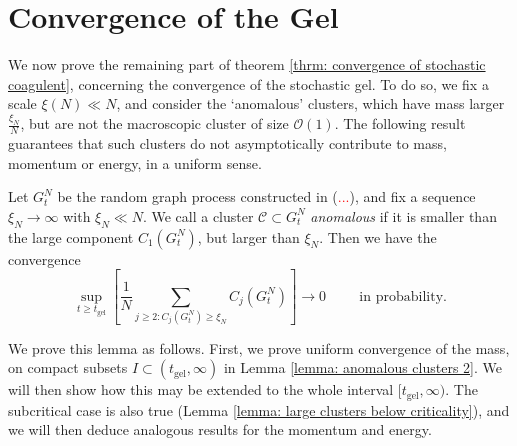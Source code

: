 \section{Convergence of the Gel} \label{sec: COG}
We now prove the remaining part of theorem \ref{thrm: convergence of stochastic coagulent}, concerning the convergence of the stochastic gel. To do so, we fix a scale $\xi(N)\ll N$, and consider the `anomalous' clusters, which have mass larger $\frac{\xi_N}{N}$, but are not the macroscopic cluster of size $\mathcal{O}(1)$. The following result guarantees that such clusters do not asymptotically contribute to mass, momentum or energy, in a uniform sense.
\begin{lemma} \label{lemma: anomalous clusters} Let $G^N_t$ be the random graph process constructed in (\textcolor{red}{...}), and fix a sequence $\xi_N\rightarrow \infty$ with $\xi_N\ll N$. We call a cluster $\mathcal{C}\subset G^N_t$ \emph{anomalous} if it is smaller than the large component $C_1(G^N_t)$, but larger than $\xi_N.$ Then we have the convergence \begin{equation}
       \sup_{t \geq t_\text{gel}}\left[\frac{1}{N}\sum_{j\geq 2: C_j(G^N_t)\geq \xi_N} C_j(G^N_t)\right] \rightarrow 0 \hspace{1cm}\text{in probability.}\end{equation} 
        \end{lemma} 
       
       We prove this lemma as follows. First, we prove uniform convergence of the mass, on compact subsets $I\subset (t_\text{gel}, \infty)$ in Lemma \ref{lemma: anomalous clusters 2}. We will then show how this may be extended to the whole interval $[t_\text{gel}, \infty)$. The subcritical case is also true (Lemma \ref{lemma: large clusters below criticality}), and we will then deduce analogous results for the momentum and energy.
       

